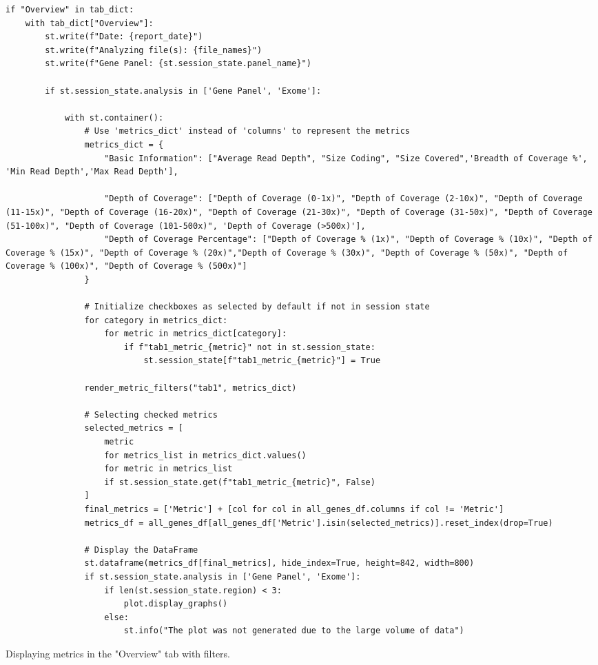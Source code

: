 \begin{longlisting}
\begin{verbatim}
if "Overview" in tab_dict:
    with tab_dict["Overview"]:
        st.write(f"Date: {report_date}")
        st.write(f"Analyzing file(s): {file_names}")
        st.write(f"Gene Panel: {st.session_state.panel_name}")

        if st.session_state.analysis in ['Gene Panel', 'Exome']:
            
            with st.container():
                # Use 'metrics_dict' instead of 'columns' to represent the metrics
                metrics_dict = {
                    "Basic Information": ["Average Read Depth", "Size Coding", "Size Covered",'Breadth of Coverage %', 'Min Read Depth','Max Read Depth'],
                    
                    "Depth of Coverage": ["Depth of Coverage (0-1x)", "Depth of Coverage (2-10x)", "Depth of Coverage (11-15x)", "Depth of Coverage (16-20x)", "Depth of Coverage (21-30x)", "Depth of Coverage (31-50x)", "Depth of Coverage (51-100x)", "Depth of Coverage (101-500x)", 'Depth of Coverage (>500x)'],
                    "Depth of Coverage Percentage": ["Depth of Coverage % (1x)", "Depth of Coverage % (10x)", "Depth of Coverage % (15x)", "Depth of Coverage % (20x)","Depth of Coverage % (30x)", "Depth of Coverage % (50x)", "Depth of Coverage % (100x)", "Depth of Coverage % (500x)"]
                }

                # Initialize checkboxes as selected by default if not in session state
                for category in metrics_dict:
                    for metric in metrics_dict[category]:
                        if f"tab1_metric_{metric}" not in st.session_state:
                            st.session_state[f"tab1_metric_{metric}"] = True

                render_metric_filters("tab1", metrics_dict)

                # Selecting checked metrics
                selected_metrics = [
                    metric
                    for metrics_list in metrics_dict.values()
                    for metric in metrics_list
                    if st.session_state.get(f"tab1_metric_{metric}", False)
                ]
                final_metrics = ['Metric'] + [col for col in all_genes_df.columns if col != 'Metric']
                metrics_df = all_genes_df[all_genes_df['Metric'].isin(selected_metrics)].reset_index(drop=True)

                # Display the DataFrame
                st.dataframe(metrics_df[final_metrics], hide_index=True, height=842, width=800)
                if st.session_state.analysis in ['Gene Panel', 'Exome']:
                    if len(st.session_state.region) < 3:
                        plot.display_graphs()
                    else:
                        st.info("The plot was not generated due to the large volume of data")
\end{verbatim}
\caption{Displaying metrics in the "Overview" tab with filters.}
\label{code:results-overview-tab}
\end{longlisting}

